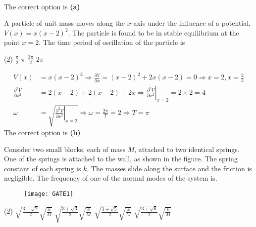 \begin{enumerate}
\begin{answer}
\begin{align*}
	\end{align*}
The correct option is \textbf{(a)}
\end{answer}
\begin{minipage}{\textwidth}
	\item A particle of unit mass moves along the $x$-axis under the influence of a potential, $V(x)=x(x-2)^{2}$. The particle is found to be in stable equilibrium at the point $x=2$. The time period of oscillation of the particle is
\end{minipage}
\begin{tasks}(2)
	\task[\textbf{A.}] $\frac{\pi}{2}$
	\task[\textbf{B.}]$\pi$
	\task[\textbf{C.}]$\frac{3 \pi}{2}$
	\task[\textbf{D.}]$2 \pi$
\end{tasks}
\begin{answer}
\begin{align*}
V(x)&=x(x-2)^{2} \Rightarrow \frac{\partial V}{\partial x}=(x-2)^{2}+2 x(x-2)=0 \Rightarrow x=2, x=\frac{2}{3}\\
\frac{\partial^{2} V}{\partial x^{2}}&=2(x-2)+2(x-2)+\left.2 x \Rightarrow \frac{\partial^{2} V}{\partial x^{2}}\right|_{x=2}=2 \times 2=4\\
\omega&=\sqrt{\left.\frac{\partial^{2} V}{\partial x^{2}}\right|_{x=2}} \Rightarrow \omega=\frac{2 \pi}{T}=2 \Rightarrow T=\pi
\end{align*}
The correct option is \textbf{(b)}	
\end{answer}
\begin{minipage}{\textwidth}
	\item Consider two small blocks, each of mass $M$, attached to two identical springs. One of the springs is attached to the wall, as shown in the figure. The spring constant of each spring is $k$. The masses slide along the surface and the friction is negligible. The frequency of one of the normal modes of the system is,
	\begin{figure}[H]
		\centering
		\texttt{[image: GATE1]}
	\end{figure}
\end{minipage}
\begin{tasks}(2)
	\task[\textbf{A.}] $\sqrt{\frac{3+\sqrt{2}}{2}} \sqrt{\frac{k}{M}}$
	\task[\textbf{B.}]$\sqrt{\frac{3+\sqrt{3}}{2} \sqrt{\frac{k}{M}}}$
	\task[\textbf{C.}]$\sqrt{\frac{3+\sqrt{5}}{2}} \sqrt{\frac{k}{M}}$
	\task[\textbf{D.}]$\sqrt{\frac{3+\sqrt{6}}{2}} \sqrt{\frac{k}{M}}$
\end{tasks}
\begin{answer}

\end{answer}
\end{enumerate}
